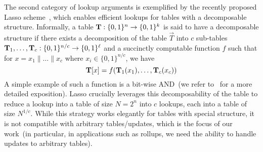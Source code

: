 
\smallskip

 The second category of lookup arguments is exemplified by the recently proposed Lasso scheme~\cite{lasso,jolt},
which enables efficient lookups for tables with a decomposable structure.
Informally, a table $\mathbf{T}:\{0,1\}^n\to \{0,1\}^k$ is said to have a decomposable structure if there exists
a decomposition of the table $\vec{T}$ into $c$ sub-tables $\mathbf{T}_1,\ldots,\mathbf{T}_c:\{0,1\}^{n/c} \to\{0,1\}^\ell$ and a
succinctly computable function $f$ such that for $x = x_1\|\ldots\|x_c$ where $x_i \in \{0,1\}^{n/c}$, we have
\[\mathbf{T}[x] = f(\mathbf{T}_1(x_1),\ldots,\mathbf{T}_c(x_c))\]
A simple example of such a function is a bit-wise AND~(we refer to~\cite{lasso,jolt} for a more detailed exposition).
Lasso crucially leverages this decomposability of the table to reduce a lookup into a table of size $N=2^n$ into $c$ lookups,
each into a table of size $N^{1/c}$.
While this strategy works elegantly for tables with special structure, it is not compatible with arbitrary tables/updates,
which is the focus of our work~(in particular, in applications such as rollups, we need the ability to handle updates to arbitrary tables).

